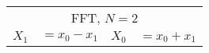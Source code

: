 \begin{tabular}{|p{4.3pt}l|p{4.3pt}l|}\toprule \multicolumn{4}{|c|}{FFT, $N=2$} \\
$X_1 $ &$= x_0 - x_1$ & $X_0 $ &$= x_0 + x_1$\\ 
\bottomrule\end{tabular}
